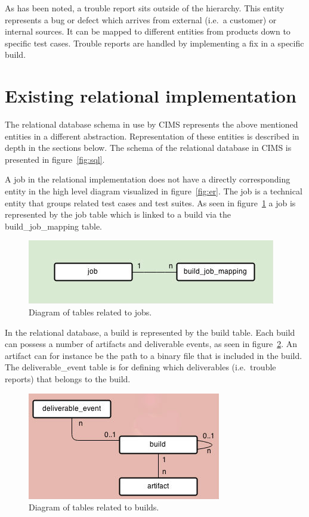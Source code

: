 As has been noted, a trouble report sits outside of the hierarchy. This entity represents a bug or defect which arrives from external (i.e.\ a customer) or internal sources. It can be mapped to different entities from products down to specific test cases. Trouble reports are handled by implementing a fix in a specific build.

\section{Existing relational implementation}
The relational database schema in use by CIMS represents the above mentioned entities in a different abstraction. Representation of these entities is described in depth in the sections below. 
The schema of the relational database in CIMS is presented in figure~\ref{fig:sql}.

A job in the relational implementation does not have a directly corresponding entity in the high level diagram visualized in figure~\ref{fig:er}. The job is a technical entity that groups related test cases and test suites. As seen in figure~\ref{fig:job} a job is represented by the job table which is linked to a build via the build\_job\_mapping table. 

\begin{figure}[h!]
\centering
\includegraphics[scale=0.5]{figure/job.jpg}
\caption{Diagram of tables related to jobs.}
\label{fig:job}
\end{figure}

In the relational database, a build is represented by the build table. Each build can possess a number of artifacts and deliverable events, as seen in figure~\ref{fig:build}. An artifact can for instance be the path to a binary file that is included in the build. The deliverable\_event table is for defining which deliverables (i.e.\ trouble reports) that belongs to the build.
\begin{figure}[h!]
\centering
\includegraphics[scale=0.5]{figure/build.jpg}
\caption{Diagram of tables related to builds.}
\label{fig:build}
\end{figure}

